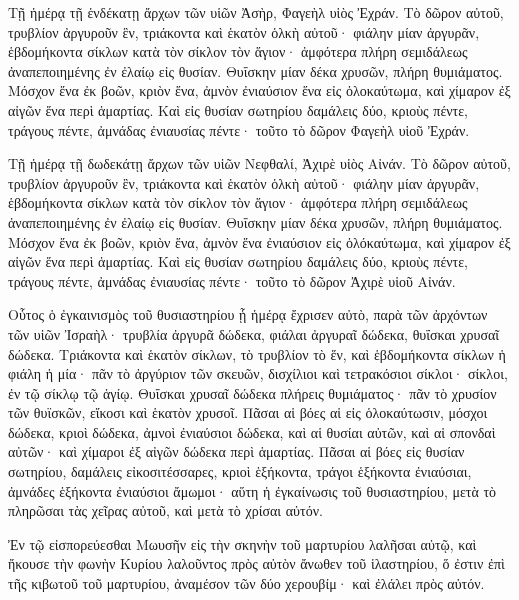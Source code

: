 {\par }{\PP {}Τῇ ἡμέρᾳ τῇ ἑνδέκατῃ ἄρχων τῶν υἱῶν Ἀσὴρ, Φαγεὴλ υἱὸς Ἐχράν.
Τὸ δῶρον αὐτοῦ, τρυβλίον ἀργυροῦν ἓν, τριάκοντα καὶ ἑκατὸν ὁλκὴ αὐτοῦ· φιάλην μίαν ἀργυρᾶν, ἑβδομήκοντα σίκλων κατὰ τὸν σίκλον τὸν ἅγιον· ἀμφότερα πλήρη σεμιδάλεως ἀναπεποιημένης ἐν ἐλαίῳ εἰς θυσίαν.
Θυΐσκην μίαν δέκα χρυσῶν, πλήρη θυμιάματος.
Μόσχον ἕνα ἐκ βοῶν, κριὸν ἕνα, ἀμνὸν ἐνιαύσιον ἕνα εἰς ὁλοκαύτωμα,
καὶ χίμαρον ἐξ αἰγῶν ἕνα περὶ ἁμαρτίας.
Καὶ εἰς θυσίαν σωτηρίου δαμάλεις δύο, κριοὺς πέντε, τράγους πέντε, ἀμνάδας ἐνιαυσίας πέντε· τοῦτο τὸ δῶρον Φαγεὴλ υἱοῦ Ἐχράν.
\par }{\PP {}Τῇ ἡμέρᾳ τῇ δωδεκάτῃ ἄρχων τῶν υἱῶν Νεφθαλί, Ἀχιρὲ υἱὸς Αἰνάν.
Τὸ δῶρον αὐτοῦ, τρυβλίον ἀργυροῦν ἓν, τριάκοντα καὶ ἑκατὸν ὁλκὴ αὐτοῦ· φιάλην μίαν ἀργυρᾶν, ἑβδομήκοντα σίκλων κατὰ τὸν σίκλον τὸν ἅγιον· ἀμφότερα πλήρη σεμιδάλεως ἀναπεποιημένης ἐν ἐλαίῳ εἰς θυσίαν.
Θυΐσκην μίαν δέκα χρυσῶν, πλήρη θυμιάματος.
Μόσχον ἕνα ἐκ βοῶν, κριὸν ἕνα, ἀμνὸν ἕνα ἐνιαύσιον εἰς ὁλόκαύτωμα,
καὶ χίμαρον ἐξ αἰγῶν ἕνα περὶ ἁμαρτίας.
Καὶ εἰς θυσίαν σωτηρίου δαμάλεις δύο, κριοὺς πέντε, τράγους πέντε, ἀμνάδας ἐνιαυσίας πέντε· τοῦτο τὸ δῶρον Ἀχιρὲ υἱοῦ Αἰνάν.
\par }{\PP {}Οὗτος ὁ ἐγκαινισμὸς τοῦ θυσιαστηρίου ᾗ ἡμέρᾳ ἔχρισεν αὐτὸ, παρὰ τῶν ἀρχόντων τῶν υἱῶν Ἰσραὴλ· τρυβλία ἀργυρᾶ δώδεκα, φιάλαι ἀργυραῖ δώδεκα, θυΐσκαι χρυσαῖ δώδεκα.
Τριάκοντα καὶ ἑκατὸν σίκλων, τὸ τρυβλίον τὸ ἕν, καὶ ἑβδομήκοντα σίκλων ἡ φιάλη ἡ μία· πᾶν τὸ ἀργύριον τῶν σκευῶν, δισχίλιοι καὶ τετρακόσιοι σίκλοι· σίκλοι, ἐν τῷ σίκλῳ τῷ ἁγίῳ.
Θυΐσκαι χρυσαῖ δώδεκα πλήρεις θυμιάματος· πᾶν τὸ χρυσίον τῶν θυϊσκῶν, εἴκοσι καὶ ἑκατὸν χρυσοῖ.
Πᾶσαι αἱ βόες αἱ εἰς ὁλοκαύτωσιν, μόσχοι δώδεκα, κριοὶ δώδεκα, ἀμνοὶ ἐνιαύσιοι δώδεκα, καὶ αἱ θυσίαι αὐτῶν, καὶ αἱ σπονδαὶ αὐτῶν· καὶ χίμαροι ἐξ αἰγῶν δώδεκα περὶ ἁμαρτίας.
Πᾶσαι αἱ βόες εἰς θυσίαν σωτηρίου, δαμάλεις εἰκοσιτέσσαρες, κριοὶ ἑξήκοντα, τράγοι ἑξήκοντα ἐνιαύσιαι, ἀμνάδες ἑξήκοντα ἐνιαύσιοι ἄμωμοι· αὕτη ἡ ἐγκαίνωσις τοῦ θυσιαστηρίου, μετὰ τὸ πληρῶσαι τὰς χεῖρας αὐτοῦ, καὶ μετὰ τὸ χρίσαι αὐτόν.
\par }{\PP {}Ἐν τῷ εἰσπορεύεσθαι Μωυσῆν εἰς τὴν σκηνὴν τοῦ μαρτυρίου λαλῆσαι αὐτῷ, καὶ ἤκουσε τὴν φωνὴν Κυρίου λαλοῦντος πρὸς αὐτὸν ἄνωθεν τοῦ ἱλαστηρίου, ὅ ἐστιν ἐπὶ τῆς κιβωτοῦ τοῦ μαρτυρίου, ἀναμέσον τῶν δύο χερουβίμ· καὶ ἐλάλει πρὸς αὐτόν.

}
